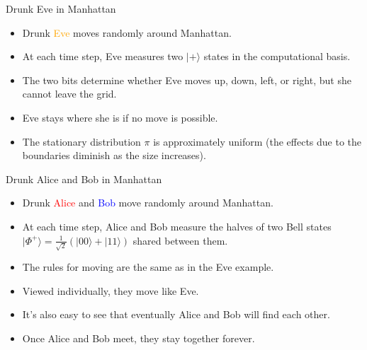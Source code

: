\documentclass{beamer}
\renewcommand{\>}{\rangle}
\newcommand{\<}{\langle}
\begin{document}

\begin{frame}{Drunk Eve in Manhattan}


\begin{itemize}
\item Drunk \textcolor{orange}{Eve} moves randomly around Manhattan.

\item At each time step, Eve measures two $|+\>$ states in the computational basis.

\item The two bits determine whether Eve moves up, down, left, or right, but she cannot leave the grid.

\item Eve stays where she is if no move is possible.

\bigskip
\item The stationary distribution $\pi$ is approximately uniform (the effects due to the boundaries diminish as the size increases).
\end{itemize}
\end{frame}


\begin{frame}{Drunk Alice and Bob in Manhattan}

\begin{itemize}
\item Drunk \textcolor{red}{Alice} and \textcolor{blue}{Bob} move randomly around Manhattan.

\item At each time step, Alice and Bob measure the halves of two Bell states $|\Phi^+\>=\tfrac{1}{\sqrt{2}}(|00\>+|11\>)$ shared between them.

\item The rules for moving are the same as in the Eve example.

\bigskip
\item Viewed individually, they move like Eve.

\item It's also easy to see that eventually Alice and Bob will find each other.

\item Once Alice and Bob meet, they stay together forever.

\end{itemize}
\end{frame}
\end{document}
